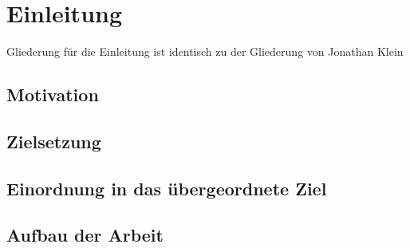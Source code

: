 \chapter{Einleitung} \label{cha:Einleitung}	
Gliederung für die Einleitung ist identisch zu der Gliederung von Jonathan Klein
\newline

\lipsum[1]

\section{Motivation}\label{sec:Motivation}

\lipsum[1]

\section{Zielsetzung}\label{sec:Zielsetzung}

\lipsum[1]

\section{Einordnung in das übergeordnete Ziel}\label{sec:ÜbergeortnetesZiel}

\lipsum[1]

\section{Aufbau der Arbeit}\label{sec:AufbauDerArbeit}

\lipsum[1]

